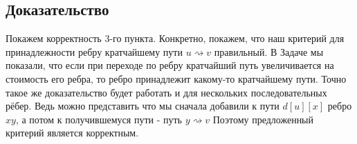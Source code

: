 \documentclass{article}
\begin{document}
    \subsection*{Доказательство}
    Покажем корректность 3-го пункта. Конкретно, покажем, что наш критерий для принадлежности ребру кратчайшему пути $u \rightsquigarrow v$ правильный. В Задаче  мы показали, что если при переходе по ребру кратчайший путь увеличивается на стоимость его ребра, то ребро принадлежит какому-то кратчайшему пути. Точно такое же доказательство будет работать и для нескольких последовательных рёбер. Ведь можно представить что мы сначала добавили к пути $d[u][x]$ ребро $xy$, а потом к получившемуся пути - путь $y \rightsquigarrow v$ Поэтому предложенный критерий является корректным.
\end{document}
